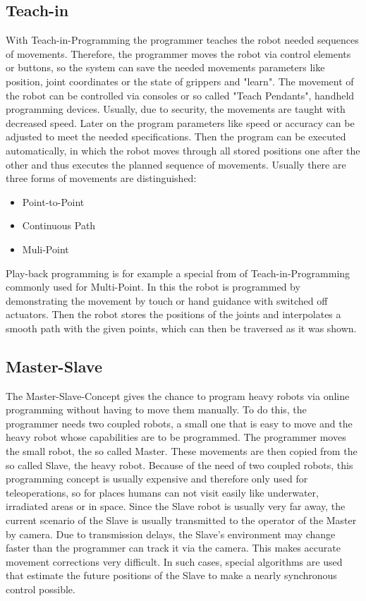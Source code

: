 \documentclass[conference]{IEEEtran}
\begin{document}
    \subsection{Teach-in}
        With Teach-in-Programming the programmer teaches the robot needed sequences of movements. Therefore, the programmer moves the robot via control elements or buttons, so the system can save the needed movements parameters like position, joint coordinates or the state of grippers and "learn". The movement of the robot can be controlled via consoles or so called "Teach Pendants", handheld programming devices. %
        Usually, due to security, the movements are taught with decreased speed. Later on the program parameters like speed or accuracy can be adjusted to meet the needed specifications. Then the program can be executed automatically, in which the robot moves through all stored positions one after the other and thus executes the planned sequence of movements. \cite[pp. 187-188]{b4} %
        Usually there are three forms of movements are distinguished:
        \begin{itemize}
            \item Point-to-Point
            \item Continuous Path
            \item Muli-Point
        \end{itemize}

        Play-back programming is for example a special from of Teach-in-Programming commonly used for Multi-Point. In this the robot is programmed by demonstrating the movement by touch or hand guidance with switched off actuators. Then the robot stores the positions of the joints and interpolates a smooth path with the given points, which can then be traversed as it was shown. \cite[pp. 188-189]{b4}%

    \subsection{Master-Slave}
        The Master-Slave-Concept gives the chance to program heavy robots via online programming without having to move them manually. To do this, the programmer needs two coupled robots, a small one that is easy to move and the heavy robot whose capabilities are to be programmed. The programmer moves the small robot, the so called Master. These movements are then copied from the so called Slave, the heavy robot. Because of the need of two coupled robots, this programming concept is usually expensive and therefore only used for teleoperations, so for places humans can not visit easily like underwater, irradiated areas or in space. Since the Slave robot is usually very far away, the current scenario of the Slave is usually transmitted to the operator of the Master by camera. Due to transmission delays, the Slave's environment may change faster than the programmer can track it via the camera. This makes accurate movement corrections very difficult. In such cases, special algorithms are used that estimate the future positions of the Slave to make a nearly synchronous control possible. \cite[p. 91]{b6}%
\end{document}
